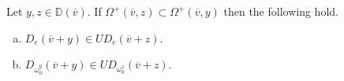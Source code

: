 \documentclass[11pt,fleqn]{amsart}
\newcommand\vv{\overline{v}}
\newcommand\DD{\mathbb D}
\begin{document}
\begin{Lemma}
\label{L:omega-contained}
Let $y,z \in \DD(\vv)$. If $\Omega^+(\vv,z) \subset \Omega^+(\vv,y)$ then the
following hold.
\begin{enumerate}[(a)]
\item 
\label{i:e}
$D_{e}(\vv + y) \in U D_{e}(\vv + z)$.

\item 
\label{i:omega}
$D_{\omega_0^y}(\vv + y) \in U D_{\omega_0^z}(\vv + z)$.
\end{enumerate}
\end{Lemma}
\end{document}
